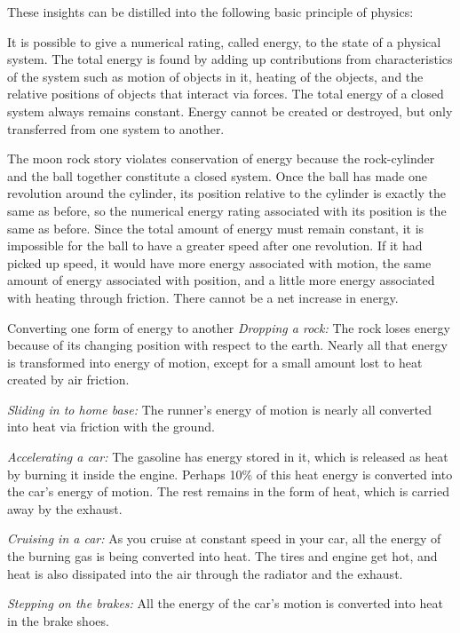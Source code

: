 These insights can be distilled into the following basic
principle of physics:

\begin{important}
It is possible to give a numerical rating, called energy, to the state
of a physical system. The total energy is found by adding up
contributions from characteristics of the system such
as motion of objects in it, heating of the objects, and the
relative positions of objects that interact via forces. The total
energy of a closed system always remains constant. Energy cannot
be created or destroyed, but only transferred from one system to another.
\end{important}

The moon rock story violates conservation of energy because
the rock-cylinder and the ball together constitute a closed
system. Once the ball has made one revolution around the
cylinder, its position relative to the cylinder is exactly
the same as before, so the numerical energy rating
associated with its position is the same as before. Since
the total amount of energy must remain constant, it is
impossible for the ball to have a greater speed after one
revolution. If it had picked up speed, it would have more
energy associated with motion, the same amount of energy
associated with position, and a little more energy
associated with heating through friction. There cannot be a
net increase in energy.

\begin{eg}{Converting one form of energy to another}
\noindent\emph{Dropping a rock:\/} The rock loses energy because of its
changing position with respect to the earth. Nearly all that
energy is transformed into energy of motion, except for a
small amount lost to heat created by air friction.

\noindent\emph{Sliding in to home base:\/} The runner's energy of motion is
nearly all converted into heat via friction with the ground.

\noindent\emph{Accelerating a car:\/} The gasoline has energy stored in it,
which is released as heat by burning it inside the engine.
Perhaps 10\% of this heat energy is converted into the car's
energy of motion. The rest remains in the form of heat,
which is carried away by the exhaust.

\noindent\emph{Cruising in a car:\/} As you cruise at constant speed in your
car, all the energy of the burning gas is being converted
into heat. The tires and engine get hot, and heat is also
dissipated into the air through the radiator and the exhaust.

\noindent\emph{Stepping on the brakes:\/} All the energy of the car's motion
is converted into heat in the brake shoes.
\end{eg}

